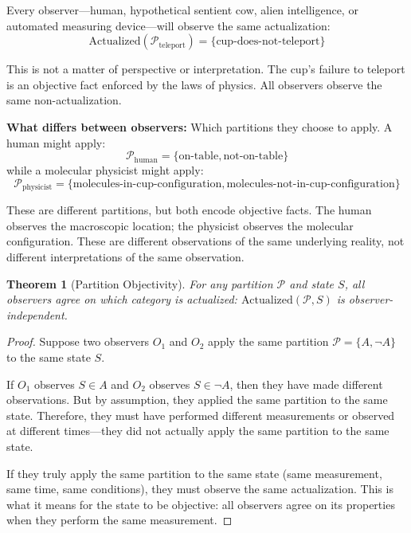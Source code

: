 \documentclass[twocolumn,10pt]{article}
\newtheorem{theorem}{Theorem}[section]
\theoremstyle{definition}
\theoremstyle{remark}
\begin{document}
\noindent Every observer—human, hypothetical sentient cow, alien intelligence, or automated measuring device—will observe the same actualization:
\begin{equation}
\text{Actualized}(\mathcal{P}_{\text{teleport}}) = \{\text{cup-does-not-teleport}\}
\end{equation}

\noindent This is not a matter of perspective or interpretation. The cup's failure to teleport is an objective fact enforced by the laws of physics. All observers observe the same non-actualization.

\vspace{0.2cm}
\noindent\textbf{What differs between observers:} Which partitions they choose to apply. A human might apply:
\begin{equation}
\mathcal{P}_{\text{human}} = \{\text{on-table}, \text{not-on-table}\}
\end{equation}
while a molecular physicist might apply:
\begin{equation}
\mathcal{P}_{\text{physicist}} = \{\text{molecules-in-cup-configuration}, \text{molecules-not-in-cup-configuration}\}
\end{equation}

\noindent These are different partitions, but both encode objective facts. The human observes the macroscopic location; the physicist observes the molecular configuration. These are different observations of the same underlying reality, not different interpretations of the same observation.

\begin{theorem}[Partition Objectivity]
\label{thm:partition_objectivity}
For any partition $\mathcal{P}$ and state $S$, all observers agree on which category is actualized: $\text{Actualized}(\mathcal{P}, S)$ is observer-independent.
\end{theorem}

\begin{proof}
Suppose two observers $O_1$ and $O_2$ apply the same partition $\mathcal{P} = \{A, \neg A\}$ to the same state $S$. 

If $O_1$ observes $S \in A$ and $O_2$ observes $S \in \neg A$, then they have made different observations. But by assumption, they applied the same partition to the same state. Therefore, they must have performed different measurements or observed at different times—they did not actually apply the same partition to the same state.

If they truly apply the same partition to the same state (same measurement, same time, same conditions), they must observe the same actualization. This is what it means for the state to be objective: all observers agree on its properties when they perform the same measurement.
\end{proof}
\end{document}
